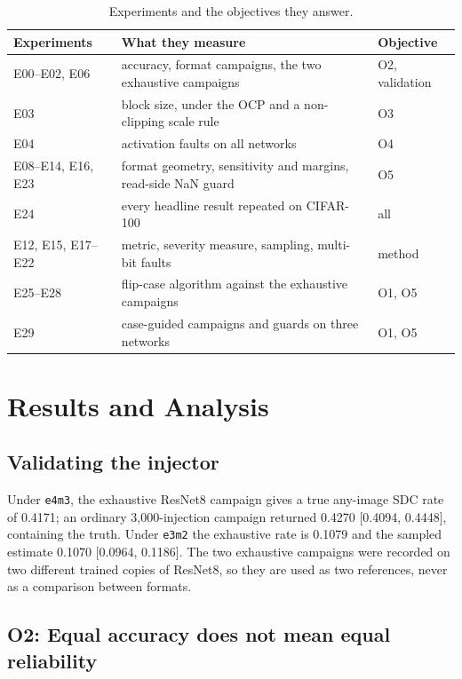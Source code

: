 \documentclass[12pt,a4paper]{article}
\newcommand{\fmt}[1]{\texttt{#1}}
\begin{document}
\begin{table}[H]
\centering
\caption{Experiments and the objectives they answer.}
\label{tab:experiments}
\small
\begin{tabular}{p{2.3cm}p{8.8cm}l}
\toprule
\textbf{Experiments} & \textbf{What they measure} & \textbf{Objective} \\
\midrule
E00--E02, E06 & accuracy, format campaigns, the two exhaustive campaigns & O2, validation \\
E03 & block size, under the OCP and a non-clipping scale rule & O3 \\
E04 & activation faults on all networks & O4 \\
E08--E14, E16, E23 & format geometry, sensitivity and margins, read-side NaN guard & O5 \\
E24 & every headline result repeated on CIFAR-100 & all \\
E12, E15, E17--E22 & metric, severity measure, sampling, multi-bit faults & method \\
E25--E28 & flip-case algorithm against the exhaustive campaigns & O1, O5 \\
E29 & case-guided campaigns and guards on three networks & O1, O5 \\
\bottomrule
\end{tabular}
\end{table}

\section{Results and Analysis}
\label{sec:results}

\subsection{Validating the injector}

Under \fmt{e4m3}, the exhaustive ResNet8 campaign gives a true any-image SDC rate of 0.4171;
an ordinary 3,000-injection campaign returned 0.4270 [0.4094, 0.4448], containing the truth.
Under \fmt{e3m2} the exhaustive rate is 0.1079 and the sampled estimate 0.1070 [0.0964,
0.1186]. The two exhaustive campaigns were recorded on two different trained copies of
ResNet8, so they are used as two references, never as a comparison between formats.

\subsection{O2: Equal accuracy does not mean equal reliability}
\end{document}

